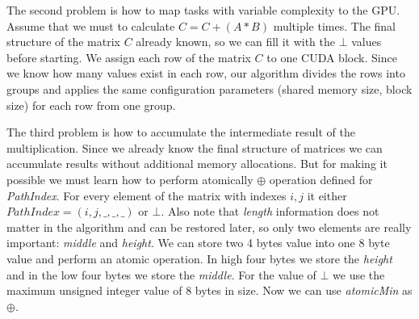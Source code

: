 The second problem is how to map tasks with variable complexity to the GPU. Assume that we must to calculate $C = C + (A * B)$ multiple times. The final structure of the matrix $C$ already known, so we can fill it with the $\bot$ values before starting. We assign each row of the matrix $C$ to one CUDA block. Since we know how many values exist in each row, our algorithm divides the rows into groups and applies the same configuration parameters (shared memory size, block size) for each row from one group.
 
The third problem is how to accumulate the intermediate result of the multiplication. Since we already know the final structure of matrices we can accumulate results without additional memory allocations. But for making it possible we must learn how to perform atomically $\oplus$ operation defined for \textit{PathIndex}. For every element of the matrix with indexes $i,j$ it either $PathIndex = (i,j,\_,\_,\_)$ or $\bot$. Also note that \textit{length} information does not matter in the algorithm and can be restored later, so only two elements are really important: \textit{middle} and \textit{height}. We can store two 4 bytes value into one 8 byte value and perform an atomic operation. In high four bytes we store the \textit{height} and in the low four bytes we store the \textit{middle}. For the value of $\bot$ we use the maximum unsigned integer value of 8 bytes in size. Now we can use \textit{atomicMin} as $\oplus$.